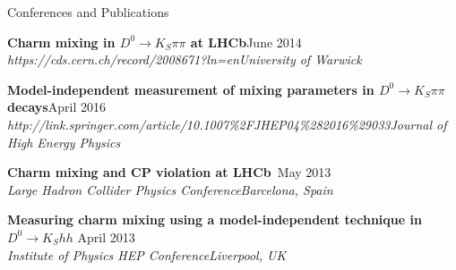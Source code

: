 \documentclass{format/resume} %
\begin{document}



\begin{rSection}{Conferences and Publications}

{\bf Charm mixing in $D^{0}\rightarrow K_{S}\pi\pi$ at LHCb}\hfill{June 2014}\\
{\it https://cds.cern.ch/record/2008671?ln=en}\hfill{\it University of Warwick}

{\bf Model-independent measurement of mixing parameters in $D^{0}\rightarrow K_{S}\pi\pi$ decays}\hfill{April 2016}\\
{\it http://link.springer.com/article/10.1007\%2FJHEP04\%282016\%29033}\hfill{\it Journal of High Energy Physics}


{\bf Charm mixing and CP violation at LHCb}\hfill{\ May 2013}\\
{\it Large Hadron Collider Physics Conference}\hfill{\it Barcelona, Spain}

{\bf Measuring charm mixing using a model-independent technique in $D^{0} \rightarrow K_{S}hh$}\hfill{ April 2013}\\
{\it Institute of Physics HEP Conference}\hfill{\it Liverpool, UK}

\end{rSection}


\end{document}
